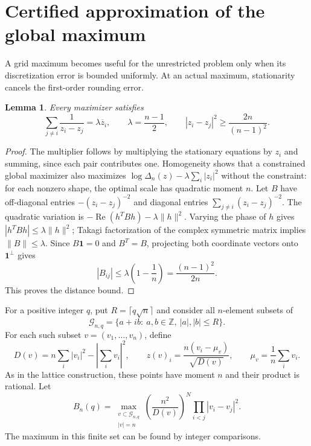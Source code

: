 \documentclass[11pt]{article}
\newtheorem{lemma}[theorem]{Lemma}
\theoremstyle{remark}
\numberwithin{equation}{section}
\begin{document}
\section{Certified approximation of the global maximum}
\label{sec:grid-global}
A grid maximum becomes useful for the unrestricted problem only when
its discretization error is bounded uniformly. At an actual maximum,
stationarity cancels the first-order rounding error.

\begin{lemma}\label{lem:global-separation}
Every maximizer satisfies
\begin{equation}\label{eq:global-separation}
 \sum_{j\ne i}\frac1{z_i-z_j}=\lambda\overline z_i,
 \qquad \lambda=\frac{n-1}{2},\qquad
 |z_i-z_j|^2\ge\frac{2n}{(n-1)^2}.
\end{equation}
\end{lemma}
\begin{proof}
The multiplier follows by multiplying the stationary equations by
$z_i$ and summing, since each pair contributes one.
Homogeneity shows that a constrained global maximizer also maximizes
$\log\Delta_n(z)-\lambda\sum_i|z_i|^2$ without the constraint:
for each nonzero shape, the optimal scale has quadratic moment $n$.
Let $B$ have off-diagonal entries $-(z_i-z_j)^{-2}$ and diagonal
entries $\sum_{j\ne i}(z_i-z_j)^{-2}$.
The quadratic variation is
$-\operatorname{Re}(h^TBh)-\lambda\|h\|^2$.
Varying the phase of $h$ gives $|h^TBh|\le\lambda\|h\|^2$;
Takagi factorization of the complex symmetric matrix implies
$\|B\|\le\lambda$.
Since $B\mathbf1=0$ and $B^T=B$, projecting both coordinate vectors
onto $\mathbf1^\perp$ gives
\[
 |B_{ij}|\le\lambda\left(1-\frac1n\right)
             =\frac{(n-1)^2}{2n}.
\]
This proves the distance bound.
\end{proof}

For a positive integer $q$, put $R=\lceil q\sqrt n\rceil$ and consider
all $n$-element subsets of
\[
 \mathcal G_{n,q}=\{a+ib:\ a,b\in\mathbb Z,\ |a|,|b|\le R\}.
\]
For each such subset $v=(v_1,\ldots,v_n)$, define
\[
 D(v)=n\sum_i|v_i|^2-\left|\sum_iv_i\right|^2,\qquad
 z(v)_i=\frac{n(v_i-\mu_v)}{\sqrt{D(v)}},\qquad
 \mu_v=\frac1n\sum_i v_i.
\]
As in the lattice construction, these points have moment $n$ and their product is
rational. Let
\begin{equation}\label{eq:grid-maximum}
 B_n(q)=\max_{\substack{v\subset\mathcal G_{n,q}\\|v|=n}}
 \left(\frac{n^2}{D(v)}\right)^N
 \prod_{i<j}|v_i-v_j|^2.
\end{equation}
The maximum in this finite set can be found by integer comparisons.
\end{document}

